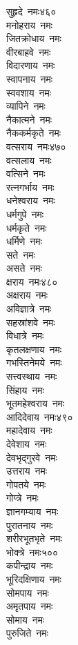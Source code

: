 \begin{multicols}{\maxColumns}
\begin{flushleft}
सुहृदे~नमः\hfill ४६०\\
मनोहराय~नमः\\
जितक्रोधाय~नमः\\
वीरबाहवे~नमः\\
विदारणाय~नमः\\
स्वापनाय~नमः\\
स्ववशाय~नमः\\
व्यापिने~नमः\\
नैकात्मने~नमः\\
नैककर्मकृते~नमः\\
वत्सराय~नमः\hfill ४७०\\
वत्सलाय~नमः\\
वत्सिने~नमः\\
रत्नगर्भाय~नमः\\
धनेश्वराय~नमः\\
धर्मगुपे~नमः\\
धर्मकृते~नमः\\
धर्मिणे~नमः\\
सते~नमः\\
असते~नमः\\
क्षराय~नमः\hfill ४८०\\
अक्षराय~नमः\\
अविज्ञात्रे~नमः\\
सहस्रांशवे~नमः\\
विधात्रे~नमः\\
कृतलक्षणाय~नमः\\
गभस्तिनेमये~नमः\\
सत्त्वस्थाय~नमः\\
सिंहाय~नमः\\
भूतमहेश्वराय~नमः\\
आदिदेवाय~नमः\hfill ४९०\\
महादेवाय~नमः\\
देवेशाय~नमः\\
देवभृद्गुरवे~नमः\\
उत्तराय~नमः\\
गोपतये~नमः\\
गोप्त्रे~नमः\\
ज्ञानगम्याय~नमः\\
पुरातनाय~नमः\\
शरीरभूतभृते~नमः\\
भोक्त्रे~नमः\hfill ५००\\
कपीन्द्राय~नमः\\
भूरिदक्षिणाय~नमः\\
सोमपाय~नमः\\
अमृतपाय~नमः\\
सोमाय~नमः\\
पुरुजिते~नमः\\

\end{flushleft}
\end{multicols}
